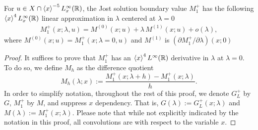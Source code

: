 \documentclass[../dissertation.tex]{subfiles}
\begin{document}
\begin{lma}\label{lma4:Mtexpansion}
	For $u \in X\cap \left\langle x \right\rangle^{-5} L_x^\infty(\mathbb R)$, the Jost solution 
	boundary value
	$M_1^+$ has the following $\left\langle x \right\rangle^4L_x^\infty(\mathbb R)$
	linear approximation in $\lambda$ centered at $\lambda = 0$
	\begin{align}
		M_1^+(x; \lambda, u) 
			= M^{(0)}(x; u) + \lambda \, M^{(1)}(x; u) + o(\lambda),
	\end{align}
	where $M^{(0)}(x; u) = M_1^+(x; \lambda = 0, u)$ and
	$M^{(1)}$ is $(\partial M_1^+ / \partial \lambda)(x; 0)$
\end{lma}
\begin{proof}
	It suffices to prove that $M_1^+$ has an $\left\langle x \right\rangle^4L^\infty(\mathbb R)$ 
	derivative in $\lambda$ at $\lambda = 0$. To do so, we 
	define $M_h$ as the difference quotient
	\[
		M_h(\lambda; x) :=
			\frac{M_1^+(x; \lambda +h) - M_1^+(x; \lambda)}{h}.
	\]
	In order to simplify notation, throughout the rest of this proof,
	we denote $G_L^+$ by $G$, $M_1^+$ by $M$, and suppress $x$ dependency.
	That is, $G(\lambda):= G_L^+(x; \lambda)$ and $M(\lambda):=M_1^+(x; \lambda)$.
	Please note that while not explicitly indicated by the notation in this
	proof, all convolutions are with respect to the variable $x$.


\end{proof}
\end{document}
